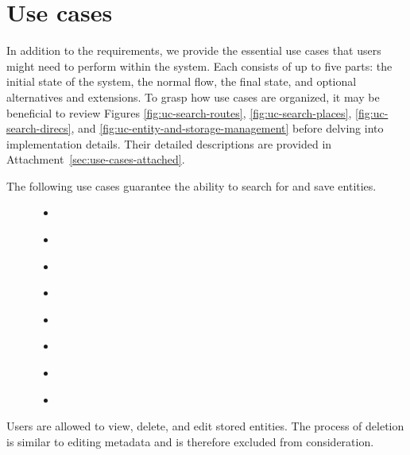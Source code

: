 \section{Use cases}\label{sec:use-cases-analysis}

In addition to the requirements, we provide the essential use cases that users might need to perform within the system. Each consists of up to five parts: the initial state of the system, the normal flow, the final state, and optional alternatives and extensions. To grasp how use cases are organized, it may be beneficial to review Figures \ref{fig:uc-search-routes}, \ref{fig:uc-search-places}, \ref{fig:uc-search-direcs}, and \ref{fig:uc-entity-and-storage-management} before delving into implementation details. Their detailed descriptions are provided in Attachment~\ref{sec:use-cases-attached}.


The following use cases guarantee the ability to search for and save entities.

\begin{figure}[!h]
  \begin{minipage}{0.42\textwidth}
    \begin{itemize}
      \item \emph{}
      \item \emph{}
      \item \emph{}
      \item \emph{}
    \end{itemize}
  \end{minipage}
  \hfill
  \begin{minipage}{0.56\textwidth}
    \begin{itemize}
      \item \emph{}
      \item \emph{}
      \item \emph{}
      \item \emph{}
    \end{itemize}
  \end{minipage}
\end{figure}

Users are allowed to view, delete, and edit stored entities. The process of dele\-tion is similar to editing metadata and is therefore excluded from consideration.

